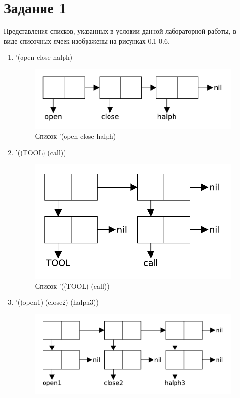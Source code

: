 \chapter{Задание \No{}1}
Представления списков, указанных в условии данной лабораторной работы, в виде списочных ячеек изображены на рисунках 0.1-0.6.

\begin{enumerate}
    \item '(open close halph)
        \begin{figure}[H]
            \centering
            \includegraphics[scale=0.75]{data/pdf/01-01.pdf}
            \caption{Список '(open close halph)}
        \end{figure}
    \item '((TOOL) (call))
        \begin{figure}[H]
            \centering
            \includegraphics[scale=0.75]{data/pdf/01-02.pdf}
            \caption{Список '((TOOL) (call))}
        \end{figure}
    \item '((open1) (close2) (halph3))
        \begin{figure}[H]
            \centering
            \includegraphics[scale=0.75]{data/pdf/01-03.pdf}

\end{figure}
\end{enumerate}
